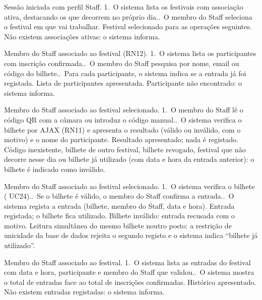 {Sessão iniciada com perfil Staff.}
{1.~O sistema lista os festivais com associação ativa, destacando os que
 decorrem no próprio dia..~O membro do Staff seleciona o festival em que vai trabalhar.}
{Festival selecionado para as operações seguintes.}
{Não existem associações ativas: o sistema informa.}

{Membro do Staff associado ao festival (RN12).}
{1.~O sistema lista os participantes com inscrição confirmada..~O membro do Staff pesquisa por nome, email ou código do bilhete..~Para cada participante, o sistema indica se a entrada já foi registada.}
{Lista de participantes apresentada.}
{Participante não encontrado: o sistema informa.}

{Membro do Staff associado ao festival selecionado.}
{1.~O membro do Staff lê o código QR com a câmara ou introduz o código
 manual..~O sistema verifica o bilhete por AJAX (RN11) e apresenta o resultado
 (válido ou inválido, com o motivo) e o nome do participante.}
{Resultado apresentado; nada é registado.}
{Código inexistente, bilhete de outro festival, bilhete revogado, festival
 que não decorre nesse dia ou bilhete já utilizado (com data e hora da
 entrada anterior): o bilhete é indicado como inválido.}

{Membro do Staff associado ao festival selecionado.}
{1.~O sistema verifica o bilhete (\incl{} UC24)..~Se o bilhete é válido, o membro do Staff confirma a entrada..~O sistema regista a entrada (bilhete, membro do Staff, data e hora).}
{Entrada registada; o bilhete fica utilizado.}
{Bilhete inválido: entrada recusada com o motivo.
 Leitura simultânea do mesmo bilhete noutro posto: a restrição de unicidade
 da base de dados rejeita o segundo registo e o sistema indica ``bilhete já
 utilizado''.}

{Membro do Staff associado ao festival.}
{1.~O sistema lista as entradas do festival com data e hora, participante e
 membro do Staff que validou..~O sistema mostra o total de entradas face ao total de inscrições
 confirmadas.}
{Histórico apresentado.}
{Não existem entradas registadas: o sistema informa.}


